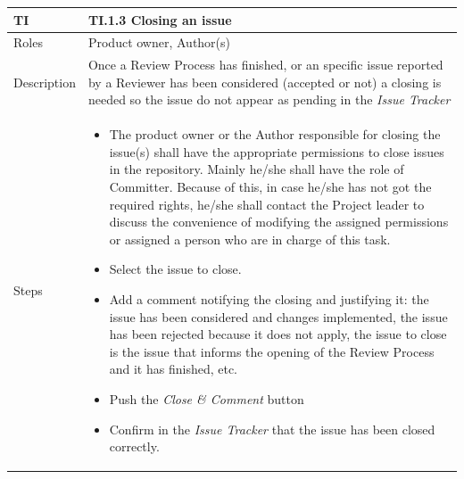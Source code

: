 \documentclass{template/openetcs_article}
\begin{document}
\begin{flushleft}
\tablefirsthead{}
\tablehead{}
\tabletail{}
\tablelasttail{}
\begin{supertabular}{|m{2cm}|m{13cm}|}
\hline
{}
TI & 
TI.1.3 Closing an issue
\\\hline
Roles &
Product owner, Author(s)
\\\hline
Description &
Once a Review Process has finished, or an specific issue reported by a Reviewer has been considered (accepted or not) a closing is needed so the issue do not appear as pending in the {\it Issue Tracker}
\\\hline
Steps &
\begin{itemize}
\item The product owner or the Author responsible for closing the issue(s) shall have the appropriate permissions to close issues in the repository. Mainly he/she shall have the role of Committer. Because of this, in case he/she has not got the required rights, he/she shall contact the Project leader to discuss the convenience of modifying the assigned permissions or assigned a person who are in charge of this task.
\item Select the issue to close.
\item Add a comment notifying the closing and justifying it: the issue has been considered and changes implemented, the issue has been rejected because it does not apply, the issue to close is the issue that informs the opening of the Review Process and it has finished, etc.
\item Push the {\it Close \& Comment} button
\item Confirm in the {\it Issue Tracker} that the issue has been closed correctly.
\end{itemize}

\\\hline
\end{supertabular}
\end{flushleft}
\end{document}
